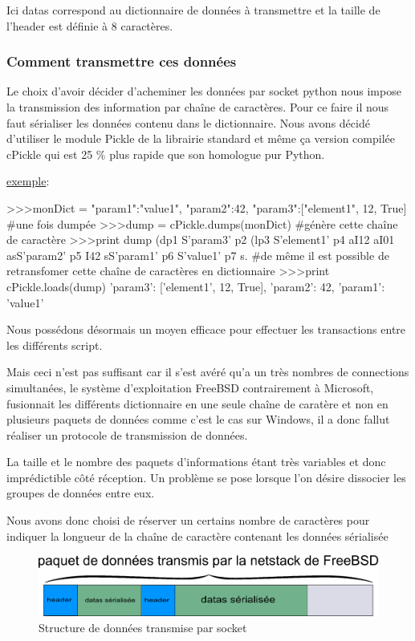 Ici datas correspond au dictionnaire de données à transmettre et la taille de l'header est définie à 8 caractères.

\newpage

\subsubsection*{Comment transmettre ces données}
Le choix d'avoir décider d'acheminer les données par socket python nous impose la transmission des information par chaîne de caractères. Pour ce faire il nous faut sérialiser les données contenu dans le dictionnaire. Nous avons décidé d'utiliser le module Pickle de la librairie standard et même ça version compilée cPickle qui est 25 \% plus rapide que son homologue pur Python. 

\underline{exemple}:
\begin{python}
>>>monDict = {"param1":"value1", "param2":42, "param3":["element1", 12, True]}
#une fois dumpée
>>>dump = cPickle.dumps(monDict)
#génère cette chaîne de caractère
>>>print dump
(dp1
S'param3'
p2
(lp3
S'element1'
p4
aI12
aI01
asS'param2'
p5
I42
sS'param1'
p6
S'value1'
p7
s.
#de même il est possible de retransfomer cette chaîne de caractères en dictionnaire
>>>print cPickle.loads(dump)
{'param3': ['element1', 12, True], 'param2': 42, 'param1': 'value1'}
\end{python}

Nous possédons désormais un moyen efficace pour effectuer les transactions entre les différents script.

Mais ceci n'est pas suffisant car il s'est avéré qu'a un très nombres de connections simultanées, le système d'exploitation FreeBSD contrairement à Microsoft, fusionnait les différents dictionnaire en une seule chaîne de caratère et non en plusieurs paquets de données comme c'est le cas sur Windows, il a donc fallut réaliser un protocole de transmission de données.

La taille et le nombre des paquets d'informations étant très variables et donc imprédictible côté réception.  Un problème se pose lorsque l'on désire dissocier les groupes de données entre eux.

Nous avons donc choisi de réserver un certains nombre de caractères pour indiquer la longueur de la chaîne de caractère contenant les données sérialisée

\begin{figure}[h!]
	\centering
	\includegraphics[scale=0.6]{images/noaprotocol.png}
	\caption{Structure de données transmise par socket}
\end{figure}



